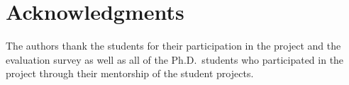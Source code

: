 \documentclass[journal,twopages]{IEEEtran}
\begin{document}
\fi

\section*{Acknowledgments}
The authors thank the students for their participation in the project and the evaluation survey as well as all of the Ph.D.\ students who participated in the project through their mentorship of the student projects.



  
\end{document}
